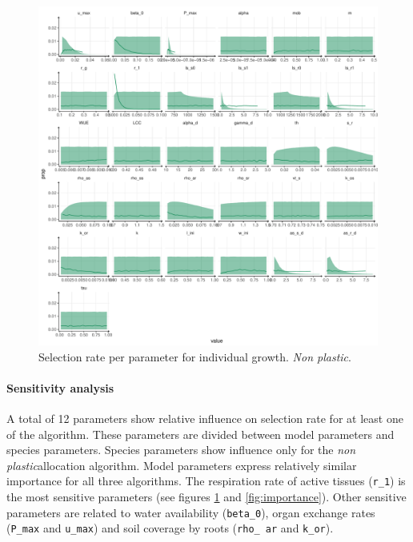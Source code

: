 

\begin{figure}[p]\label{fig:accept_rate}
\includegraphics[width = \textwidth]{./2_PP/Figures/Calibration/acceptance_rate_RSRnWeight_per_par_none.pdf}
\caption{Selection rate per parameter for individual growth. \textit{Non plastic}.}
\end{figure}



\paragraph{Sensitivity analysis}


A total of 12 parameters show relative influence on selection rate for at least one of the algorithm. These parameters are divided between model parameters and species parameters. Species parameters show influence only for the \textit{non plastic}allocation algorithm. Model parameters express relatively similar importance for all three algorithms. The respiration rate of active tissues (\texttt{r\_1}) is the most sensitive parameters (see figures \ref{fig:accept_rate} and \ref{fig:importance}). Other sensitive parameters are related to water availability (\texttt{beta\_0}), organ exchange rates (\texttt{P\_max} and \texttt{u\_max}) and soil coverage by roots (\texttt{rho\_ ar} and \texttt{k\_or}).

